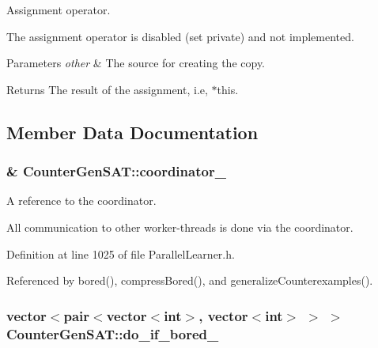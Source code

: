 Assignment operator. 

The assignment operator is disabled (set private) and not implemented.


\begin{DoxyParams}{Parameters}
{\em other} & The source for creating the copy. \\
\hline
\end{DoxyParams}
\begin{DoxyReturn}{Returns}
The result of the assignment, i.\-e, $\ast$this. 
\end{DoxyReturn}


\subsection{Member Data Documentation}
\hypertarget{classCounterGenSAT_a90c79c0fa427fcd2dacd760421f5afe4}{
\subsubsection[{coordinator\-\_\-}]{\& Counter\-Gen\-S\-A\-T\-::coordinator\-\_\-\hspace{0.3cm}{\ttfamily [protected]}}}\label{classCounterGenSAT_a90c79c0fa427fcd2dacd760421f5afe4}


A reference to the coordinator. 

All communication to other worker-\/threads is done via the coordinator. 

Definition at line 1025 of file Parallel\-Learner.\-h.



Referenced by bored(), compress\-Bored(), and generalize\-Counterexamples().

\hypertarget{classCounterGenSAT_ae4f7bf80b40a44580fde913f300ac4c1}{
\subsubsection[{do\-\_\-if\-\_\-bored\-\_\-}]{\setlength{\rightskip}{0pt plus 5cm}vector$<$pair$<$vector$<$int$>$, vector$<$int$>$ $>$ $>$ Counter\-Gen\-S\-A\-T\-::do\-\_\-if\-\_\-bored\-\_\-\hspace{0.3cm}{\ttfamily [protected]}}}\label{classCounterGenSAT_ae4f7bf80b40a44580fde913f300ac4c1}


